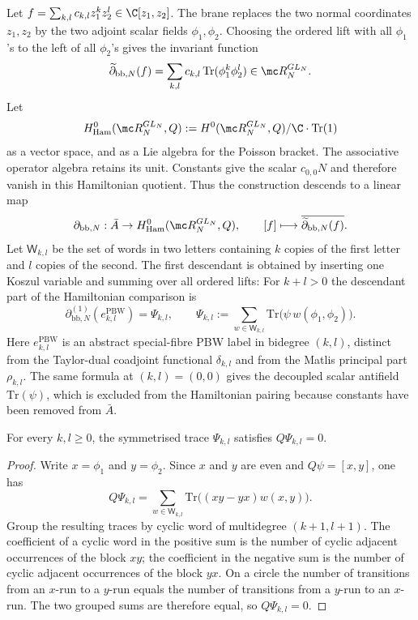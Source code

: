 \documentclass[11pt]{memoir}
\begin{document}
\begin{constr}\label{constr:boundary-evaluation}
  Let $f=\sum_{k,l}c_{k,l}z_1^kz_2^l\in\C[z_1,z_2]$. The brane replaces the
  two normal coordinates $z_1,z_2$ by the two adjoint scalar fields
  $\phi_1,\phi_2$. Choosing the ordered lift with all $\phi_1$'s to the left
  of all $\phi_2$'s gives the invariant function
  $$\widetilde\partial_{\mathrm{bb},N}(f)
    =\sum_{k,l}c_{k,l}\,\mathrm{Tr}(\phi_1^k\phi_2^l)
    \in\mc R_N^{GL_N}.$$
  Let
  $$H^0_{\mathrm{Ham}}(\mc R_N^{GL_N},Q)
    :=H^0(\mc R_N^{GL_N},Q)/\C\cdot\mathrm{Tr}(1)$$
  as a vector space, and as a Lie algebra for the Poisson bracket. The
  associative operator algebra retains its unit. Constants give the scalar
  $c_{0,0}N$ and therefore vanish in this Hamiltonian quotient.
  Thus the construction descends to a linear map
  $$\partial_{\mathrm{bb},N}:\bar A\to
    H^0_{\mathrm{Ham}}(\mc R_N^{GL_N},Q),\qquad
    [f]\longmapsto \overline{\widetilde\partial_{\mathrm{bb},N}(f)}.$$
  Let $\mathsf W_{k,l}$ be the set of words in two letters containing $k$
  copies of the first letter and $l$ copies of the second. The first descendant
  is obtained by inserting one Koszul variable and summing over all ordered
  lifts:
  For $k+l>0$ the descendant part of the Hamiltonian comparison is
  $$\partial_{\mathrm{bb},N}^{(1)}(e^{\mathrm{PBW}}_{k,l})=\Psi_{k,l},\qquad
    \Psi_{k,l}:=\sum_{w\in\mathsf W_{k,l}}
      \mathrm{Tr}\bigl(\psi\,w(\phi_1,\phi_2)\bigr).$$
  Here $e^{\mathrm{PBW}}_{k,l}$ is an abstract special-fibre PBW label in
  bidegree $(k,l)$, distinct from the Taylor-dual coadjoint functional
  $\delta_{k,l}$ and from the Matlis principal part $\rho_{k,l}$.
  The same formula at $(k,l)=(0,0)$ gives the decoupled scalar antifield
  $\mathrm{Tr}(\psi)$, which is excluded from the Hamiltonian pairing because
  constants have been removed from $\bar A$.
\end{constr}

\begin{lem}\label{lem:first-descendant-cycles}
  For every $k,l\geq0$, the symmetrised trace $\Psi_{k,l}$ satisfies
  $Q\Psi_{k,l}=0$.
\end{lem}

\begin{proof}
  Write $x=\phi_1$ and $y=\phi_2$. Since $x$ and $y$ are even and
  $Q\psi=[x,y]$, one has
  $$Q\Psi_{k,l}
    =\sum_{w\in\mathsf W_{k,l}}\mathrm{Tr}\bigl((xy-yx)w(x,y)\bigr).$$
  Group the resulting traces by cyclic word of multidegree $(k+1,l+1)$. The
  coefficient of a cyclic word in the positive sum is the number of cyclic
  adjacent occurrences of the block $xy$; the coefficient in the negative sum
  is the number of cyclic adjacent occurrences of the block $yx$. On a circle
  the number of transitions from an $x$-run to a $y$-run equals the number of
  transitions from a $y$-run to an $x$-run. The two grouped sums are therefore
  equal, so $Q\Psi_{k,l}=0$.
\end{proof}
\end{document}

